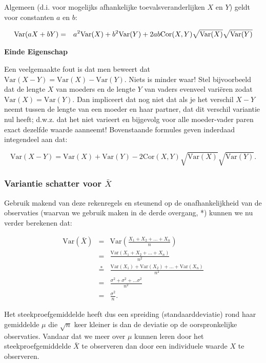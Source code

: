 \documentclass[
  dutch,
  letterpaper,
  12pt]{book}
\theoremstyle{definition}
\theoremstyle{definition}
\theoremstyle{definition}
\theoremstyle{remark}
\begin{document}
Algemeen (d.i. voor mogelijks afhankelijke toevalsveranderlijken \(X\)
en \(Y\)) geldt voor constanten \(a\) en \(b\):

\begin{eqnarray*}
\text{Var}(aX+bY) &=& a^2 \text{Var}(X) + b^2 \text{Var}(Y) + 2 ab {%
\text{Cor}}(X,Y)\sqrt{\text{Var}(X)}\sqrt{\text{Var}(Y)}
\end{eqnarray*}

\textbf{Einde Eigenschap}

Een veelgemaakte fout is dat men beweert dat
\(\text{Var}(X-Y)=\text{Var}(X)-\text{Var}(Y)\). Niets is minder waar!
Stel bijvoorbeeld dat de lengte \(X\) van moeders en de lengte \(Y\) van
vaders evenveel variëren zodat \(\text{Var}(X)=\text{Var}(Y)\). Dan
impliceert dat nog niet dat als je het verschil \(X-Y\) neemt tussen de
lengte van een moeder en haar partner, dat dit verschil variantie nul
heeft; d.w.z. dat het niet varieert en bijgevolg voor alle moeder-vader
paren exact dezelfde waarde aanneemt! Bovenstaande formules geven
inderdaad integendeel aan dat:

\begin{equation*}
\text{Var}(X-Y) = \text{Var}(X) + \text{Var}(Y) -2{\text{Cor}}(X,Y)\sqrt{\text{Var}(X)}\sqrt{\text{Var}(Y)}.
\end{equation*}

\subsubsection{\texorpdfstring{Variantie schatter voor
\(\bar X\)}{Variantie schatter voor \textbackslash bar X}}\label{variantie-schatter-voor-bar-x}

Gebruik makend van deze rekenregels en steunend op de onafhankelijkheid
van de observaties (waarvan we gebruik maken in de derde overgang, *)
kunnen we nu verder berekenen dat:

\begin{eqnarray*}
\text{Var}(\bar X)&=&\text{Var} \left(\frac{X_1+ X_2+ ... + X_n}{n}\right) \\
&= & \frac{\text{Var} (X_1+ X_2+ ... + X_n)}{n^2} \\
&\overset{*}{=} & \frac{\text{Var}(X_1)+ \text{Var}(X_2)+ ... + \text{Var}(X_n)}{n^2} \\
&=& \frac{\sigma^2 + \sigma^2 + ... \sigma^2}{n^2} \\
&= & \frac{\sigma^2}{n}.
\end{eqnarray*}

Het steekproefgemiddelde heeft dus een spreiding (standaarddeviatie)
rond haar gemiddelde \(\mu\) die \(\sqrt{n}\) keer kleiner is dan de
deviatie op de oorspronkelijke observaties. Vandaar dat we meer over
\(\mu\) kunnen leren door het steekproefgemiddelde \(\bar X\) te
observeren dan door een individuele waarde \(X\) te observeren.
\end{document}
